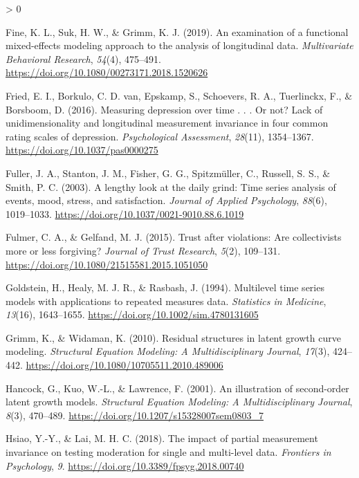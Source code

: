 \documentclass[
12pt, %
twoside,
english]{guelphthesis}
\newlength{\cslhangindent}
\newenvironment{CSLReferences}[2] %
 {%
  \setlength{\parindent}{0pt}
  \ifodd #1 \everypar{\setlength{\hangindent}{\cslhangindent}}\ignorespaces\fi
  \ifnum #2 > 0
  \setlength{\parskip}{\linespacing{2}}
  \fi
 }%
 {}
\begin{document}
\begin{CSLReferences}{1}{0}
\leavevmode{}%
Fine, K. L., Suk, H. W., \& Grimm, K. J. (2019). An examination of a functional mixed-effects modeling approach to the analysis of longitudinal data. \emph{Multivariate Behavioral Research}, \emph{54}(4), 475--491. \url{https://doi.org/10.1080/00273171.2018.1520626}

\leavevmode{}%
Fried, E. I., Borkulo, C. D. van, Epskamp, S., Schoevers, R. A., Tuerlinckx, F., \& Borsboom, D. (2016). Measuring depression over time . . . Or not? Lack of unidimensionality and longitudinal measurement invariance in four common rating scales of depression. \emph{Psychological Assessment}, \emph{28}(11), 1354--1367. \url{https://doi.org/10.1037/pas0000275}

\leavevmode{}%
Fuller, J. A., Stanton, J. M., Fisher, G. G., Spitzmüller, C., Russell, S. S., \& Smith, P. C. (2003). A lengthy look at the daily grind: Time series analysis of events, mood, stress, and satisfaction. \emph{Journal of Applied Psychology}, \emph{88}(6), 1019--1033. \url{https://doi.org/10.1037/0021-9010.88.6.1019}

\leavevmode{}%
Fulmer, C. A., \& Gelfand, M. J. (2015). Trust after violations: Are collectivists more or less forgiving? \emph{Journal of Trust Research}, \emph{5}(2), 109--131. \url{https://doi.org/10.1080/21515581.2015.1051050}

\leavevmode{}%
Goldstein, H., Healy, M. J. R., \& Rasbash, J. (1994). Multilevel time series models with applications to repeated measures data. \emph{Statistics in Medicine}, \emph{13}(16), 1643--1655. \url{https://doi.org/10.1002/sim.4780131605}

\leavevmode{}%
Grimm, K., \& Widaman, K. (2010). Residual structures in latent growth curve modeling. \emph{Structural Equation Modeling: A Multidisciplinary Journal}, \emph{17}(3), 424--442. \url{https://doi.org/10.1080/10705511.2010.489006}

\leavevmode{}%
Hancock, G., Kuo, W.-L., \& Lawrence, F. (2001). An illustration of second-order latent growth models. \emph{Structural Equation Modeling: A Multidisciplinary Journal}, \emph{8}(3), 470--489. \url{https://doi.org/10.1207/s15328007sem0803_7}

\leavevmode{}%
Hsiao, Y.-Y., \& Lai, M. H. C. (2018). The impact of partial measurement invariance on testing moderation for single and multi-level data. \emph{Frontiers in Psychology}, \emph{9}. \url{https://doi.org/10.3389/fpsyg.2018.00740}


\end{CSLReferences}
\end{document}

